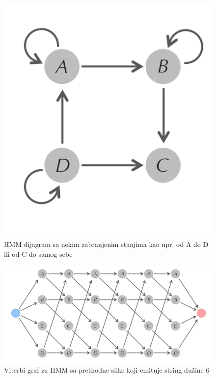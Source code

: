 \begin{minipage}{\textwidth}
	\centering
	\begin{minipage}{0.3\textwidth}
		
		\begin{figure}[H]
			\centering
			\includegraphics[width=\textwidth]{poglavlja/10/slike/brzina_Viterbi_1.png}
			\caption{HMM dijagram sa nekim zabranjenim stanjima kao npr. od A do D ili od C do samog sebe}
			\label{slika: viterbi_1}
		\end{figure}  
	\end{minipage}
	\hfill 
	\begin{minipage}{0.6\textwidth}
		\begin{figure}[H]
			\centering
			\includegraphics[width=\textwidth]{poglavlja/10/slike/brzina_Viterbi_2.png}
			\caption{Viterbi graf za HMM sa prethodne slike koji emituje string dužine 6}
			\label{slika: viterbi_2}
		\end{figure} 
	\end{minipage}
	\vspace*{1em}
\end{minipage}


